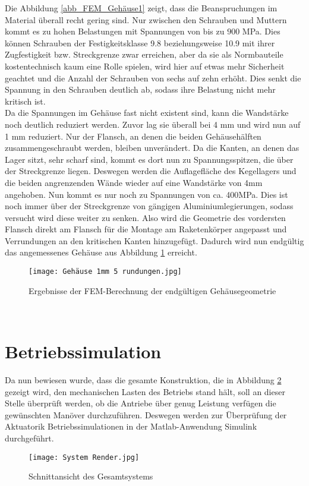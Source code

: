 Die Abbildung \ref{abb_FEM_Gehäuse1} zeigt, dass die Beanspruchungen im Material überall recht gering sind. Nur zwischen den Schrauben und Muttern kommt es zu hohen Belastungen mit Spannungen von bis zu $900$ MPa. Dies können Schrauben der Festigkeitsklasse 9.8 beziehungsweise 10.9 mit ihrer Zugfestigkeit bzw. Streckgrenze zwar erreichen, aber da sie als Normbauteile kostentechnisch kaum eine Rolle spielen, wird hier auf etwas mehr Sicherheit geachtet und die Anzahl der Schrauben von sechs auf zehn erhöht. Dies senkt die Spannung in den Schrauben deutlich ab, sodass ihre Belastung nicht mehr kritisch ist.\\
Da die Spannungen im Gehäuse fast nicht existent sind, kann die Wandstärke noch deutlich reduziert werden. Zuvor lag sie überall bei 4 mm und wird nun auf 1 mm reduziert. Nur der Flansch, an denen die beiden Gehäusehälften zusammengeschraubt werden, bleiben unverändert. Da die Kanten, an denen das Lager sitzt, sehr scharf sind, kommt es dort nun zu Spannungsspitzen, die über der Streckgrenze liegen. Deswegen werden die Auflagefläche des Kegellagers und die beiden angrenzenden Wände wieder auf eine Wandstärke von 4mm angehoben. Nun kommt es nur noch zu Spannungen von ca. 400MPa. Dies ist noch immer über der Streckgrenze von gängigen Aluminiumlegierungen, sodass versucht wird diese weiter zu senken. Also wird die Geometrie des vordersten Flansch direkt am Flansch für die Montage am Raketenkörper angepasst und Verrundungen an den kritischen Kanten hinzugefügt. Dadurch wird nun endgültig das angemessenes Gehäuse aus Abbildung \ref{abb_FEM_Gehäuse2} erreicht.
\begin{figure}[h] 
	\centering
	\texttt{[image: Gehäuse 1mm 5 rundungen.jpg]}
	\caption{Ergebnisse der FEM-Berechnung der endgültigen Gehäusegeometrie}
	\label{abb_FEM_Gehäuse2}
\end{figure}\\
\section{Betriebssimulation}\label{sec:betriebssim}
Da nun bewiesen wurde, dass die gesamte Konstruktion, die in Abbildung \ref{abb_gesamt_sys} gezeigt wird, den mechanischen Lasten des Betriebs stand hält, soll an dieser Stelle überprüft werden, ob die Antriebe über genug Leistung verfügen die gewünschten Manöver durchzuführen. Deswegen werden zur Überprüfung der Aktuatorik Betriebssimulationen in der Matlab-Anwendung Simulink durchgeführt.
\begin{figure}[h] 
	\centering
	\texttt{[image: System Render.jpg]}
	\caption{Schnittansicht des Gesamtsystems}
	\label{abb_gesamt_sys}
\end{figure}
